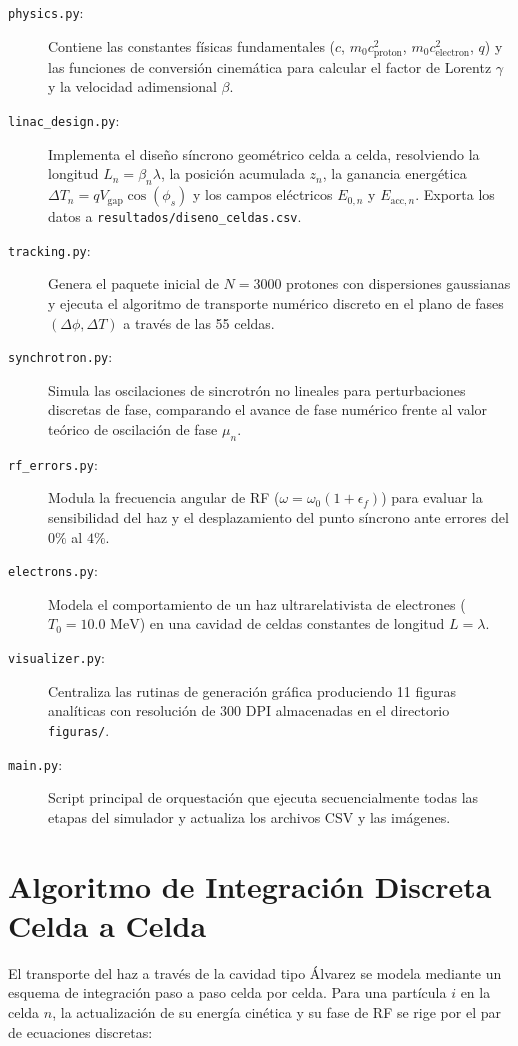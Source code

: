 \begin{description}
    \item[\texttt{physics.py}:] Contiene las constantes físicas fundamentales ($c$, $m_0 c^2_{\text{proton}}$, $m_0 c^2_{\text{electron}}$, $q$) y las funciones de conversión cinemática para calcular el factor de Lorentz $\gamma$ y la velocidad adimensional $\beta$.
    \item[\texttt{linac\_design.py}:] Implementa el diseño síncrono geométrico celda a celda, resolviendo la longitud $L_n = \beta_n \lambda$, la posición acumulada $z_n$, la ganancia energética $\Delta T_n = q V_{\text{gap}} \cos(\phi_s)$ y los campos eléctricos $E_{0,n}$ y $E_{\text{acc},n}$. Exporta los datos a \texttt{resultados/diseno\_celdas.csv}.
    \item[\texttt{tracking.py}:] Genera el paquete inicial de $N = 3000$ protones con dispersiones gaussianas y ejecuta el algoritmo de transporte numérico discreto en el plano de fases $(\Delta\phi, \Delta T)$ a través de las 55 celdas.
    \item[\texttt{synchrotron.py}:] Simula las oscilaciones de sincrotrón no lineales para perturbaciones discretas de fase, comparando el avance de fase numérico frente al valor teórico de oscilación de fase $\mu_n$.
    \item[\texttt{rf\_errors.py}:] Modula la frecuencia angular de RF ($\omega = \omega_0 (1 + \epsilon_f)$) para evaluar la sensibilidad del haz y el desplazamiento del punto síncrono ante errores del $0\%$ al $4\%$.
    \item[\texttt{electrons.py}:] Modela el comportamiento de un haz ultrarelativista de electrones ($T_0 = 10.0\text{ MeV}$) en una cavidad de celdas constantes de longitud $L = \lambda$.
    \item[\texttt{visualizer.py}:] Centraliza las rutinas de generación gráfica produciendo 11 figuras analíticas con resolución de 300 DPI almacenadas en el directorio \texttt{figuras/}.
    \item[\texttt{main.py}:] Script principal de orquestación que ejecuta secuencialmente todas las etapas del simulador y actualiza los archivos CSV y las imágenes.
\end{description}

\section{Algoritmo de Integración Discreta Celda a Celda}
El transporte del haz a través de la cavidad tipo Álvarez se modela mediante un esquema de integración paso a paso celda por celda. Para una partícula $i$ en la celda $n$, la actualización de su energía cinética y su fase de RF se rige por el par de ecuaciones discretas:


